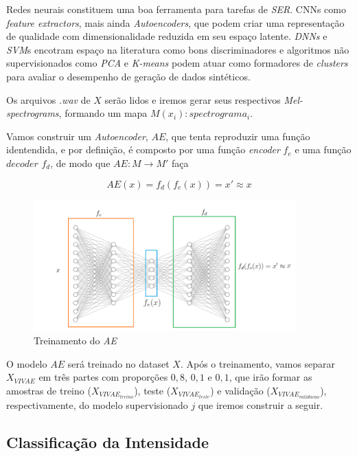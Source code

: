 Redes neurais constituem uma boa ferramenta para tarefas de \textit{SER}. CNNs como \textit{feature extractors}, mais ainda \textit{Autoencoders}, que podem criar uma representação de qualidade com dimensionalidade reduzida em seu espaço latente. \textit{DNNs} e \textit{SVM}s encotram espaço na literatura como bons discriminadores e algoritmos não supervisionados como \textit{PCA} e \textit{K-means} podem atuar como formadores de \textit{clusters} para avaliar o desempenho de geração de dados sintéticos.

Os arquivos \textit{.wav} de $X$ serão lidos e iremos gerar seus respectivos \textit{Mel-spectrograms}, formando um mapa $M(x_i): spectrograma_i$.

Vamos construir um \textit{Autoencoder}, $AE$, que tenta reproduzir uma função identendida, e por definição, é composto por uma função \textit{encoder} $f_e$ e uma função $decoder$ $f_d$, de modo que $AE: M \rightarrow M'$ faça

\begin{equation}
    AE(x) = f_d(f_e(x)) = x' \approx x
\end{equation}

\begin{figure}[!h]
\centering
\includegraphics[width=0.9\textwidth]{imagens/p-autoencoder.png}
\caption{\label{fig:treinamentoae}Treinamento do \textit{AE}}
\end{figure}

O modelo $AE$ será treinado no dataset $X$. Após o treinamento, vamos separar $X_{VIVAE}$ em três partes com proporções $0,8$, $0,1$ e $0,1$, que irão formar as amostras de treino ($X_{VIVAE_{treino}}$), teste ($X_{VIVAE_{teste}}$) e validação ($X_{VIVAE_{validacao}}$), respectivamente, do modelo supervisionado $j$ que iremos construir a seguir.

\subsection{Classificação da Intensidade}

